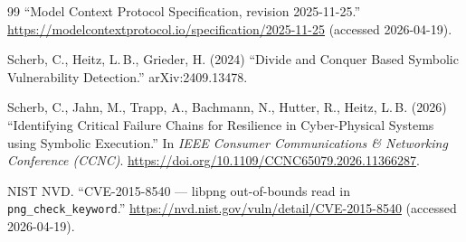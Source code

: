 \documentclass[3p,times,procedia]{elsarticle}
\begin{document}
\begin{thebibliography}{99}
 ``Model Context Protocol Specification, revision 2025-11-25.'' \url{https://modelcontextprotocol.io/specification/2025-11-25} (accessed 2026-04-19).

 Scherb, C., Heitz, L.\,B., Grieder, H. (2024) ``Divide and Conquer Based Symbolic Vulnerability Detection.'' arXiv:2409.13478.

 Scherb, C., Jahn, M., Trapp, A., Bachmann, N., Hutter, R., Heitz, L.\,B. (2026) ``Identifying Critical Failure Chains for Resilience in Cyber-Physical Systems using Symbolic Execution.'' In \emph{IEEE Consumer Communications \& Networking Conference (CCNC)}. \url{https://doi.org/10.1109/CCNC65079.2026.11366287}.

 NIST NVD. ``CVE-2015-8540 --- libpng out-of-bounds read in \texttt{png\_check\_keyword}.'' \url{https://nvd.nist.gov/vuln/detail/CVE-2015-8540} (accessed 2026-04-19).

\end{thebibliography}
\end{document}
